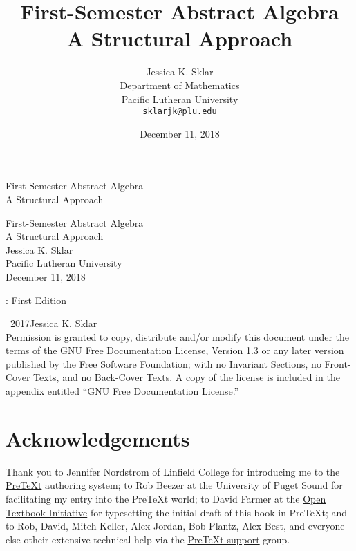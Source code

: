 \documentclass[10pt,]{book}
\title{First-Semester Abstract Algebra\\
{\large A Structural Approach}}
\author{Jessica K. Sklar\\
Department of Mathematics\\
Pacific Lutheran University\\
\href{mailto:sklarjk@plu.edu}{\nolinkurl{sklarjk@plu.edu}}
}
\date{December 11, 2018}
\theoremstyle{plain}
\theoremstyle{definition}
\theoremstyle{definition}
\theoremstyle{definition}
\theoremstyle{definition}
\numberwithin{equation}{section}
\begin{document}
\frontmatter
\thispagestyle{empty}
{\centering
\vspace*{0.28\textheight}
{\Huge First-Semester Abstract Algebra}\\[2\baselineskip]
{\LARGE A Structural Approach}\\
}
\clearpage
\thispagestyle{empty}
\null%
\clearpage
\thispagestyle{empty}
{\centering
\vspace*{0.14\textheight}
{\Huge First-Semester Abstract Algebra}\\[\baselineskip]
{\LARGE A Structural Approach}\\[3\baselineskip]
{\Large Jessica K. Sklar}\\[0.5\baselineskip]
{\Large Pacific Lutheran University}\\[3\baselineskip]
{\Large December 11, 2018}\\}
\clearpage
\thispagestyle{empty}
: First Edition\par\medskip
\noindent\textcopyright\ 2017\quad{}Jessica K. Sklar\\[0.5\baselineskip]
Permission is granted to copy, distribute and/or modify this document under the terms of the GNU Free Documentation License, Version 1.3 or any later version published by the Free Software Foundation; with no Invariant Sections, no Front-Cover Texts, and no Back-Cover Texts.  A copy of the license is included in the appendix entitled ``GNU Free Documentation License.''\par\medskip
{}
\null\clearpage
\chapter*{Acknowledgements}\label{acknowledgement-1}
Thank you to Jennifer Nordstrom of Linfield College for introducing me to the \href{http://mathbook.pugetsound.edu}{PreTeXt} authoring system; to Rob Beezer at the University of Puget Sound for facilitating my entry into the PreTeXt world;  to David Farmer at the \href{https://aimath.org/textbooks/}{Open Textbook Initiative} for typesetting the initial draft of this book in PreTeXt; and to Rob, David, Mitch Keller, Alex Jordan, Bob Plantz, Alex Best, and everyone else otheir extensive technical help via the \href{https://groups.google.com/forum/?fromgroups\#!forum/pretext-support}{PreTeXt support} group.%
\end{document}
